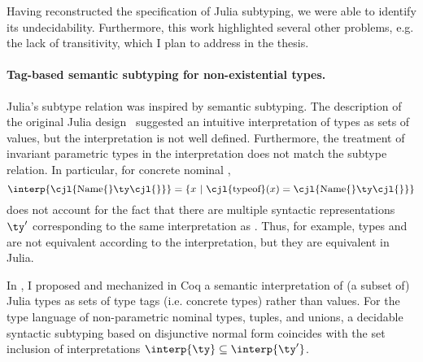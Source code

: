 Having reconstructed the specification of Julia subtyping,
we were able to identify its undecidability. Furthermore, this work highlighted
several other problems, e.g. the lack of transitivity,
which I plan to address in the thesis.

\paragraph{Tag-based semantic subtyping for non-existential types.}
Julia's subtype relation was inspired by semantic subtyping.
The description of the original Julia design~\cite{bib:bezanson:julia:2015}
suggested an intuitive interpretation of types as sets of values,
but the interpretation is not well defined.
Furthermore, the treatment of invariant parametric types
in the interpretation does not match
the subtype relation. In particular, for concrete nominal ,
\[
  \interp{\text{\cjl{Name\{}}\ty\text{\cjl{\}}}} =
  \{ x\ |\ \text{\cjl{typeof}}(x) = \text{\cjl{Name\{}}\ty\text{\cjl{\}}} \}   
\]
does not account for the fact that there are multiple syntactic
representations $\ty'$ corresponding to the same interpretation as \ty.
Thus, for example, types  and 
are not equivalent according to the interpretation,
but they are equivalent in Julia.

In \cite{belyakova:minijl-sub:ftfjp:2019}, I proposed and mechanized in Coq
a semantic interpretation of (a subset of) Julia
types \ty as sets of type tags \gty (i.e. concrete types) rather than values.
For the type language of non-parametric nominal types, tuples, and unions,
a decidable syntactic subtyping based on disjunctive normal form
coincides with the set inclusion of interpretations
$\interp{\ty} \subseteq \interp{\ty'}$.

